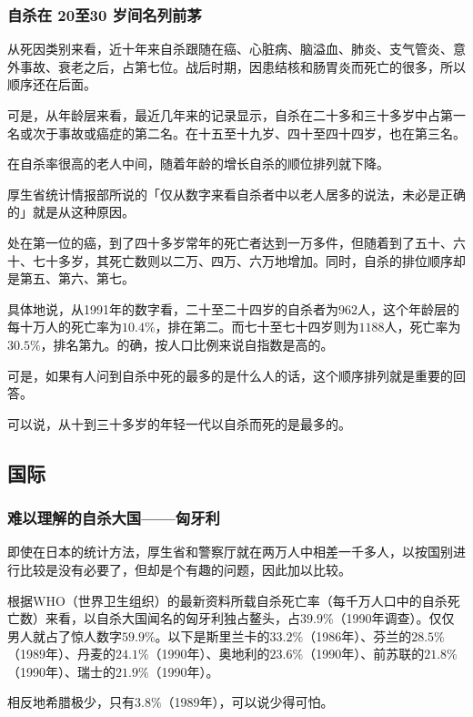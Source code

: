 \documentclass[UTF8]{ctexart}
\begin{document}
\subsubsection*{自杀在 20至30 岁间名列前茅}

从死因类别来看，近十年来自杀跟随在癌、心脏病、脑溢血、肺炎、支气管炎、意外事故、衰老之后，占第七位。战后时期，因患结核和肠胃炎而死亡的很多，所以顺序还在后面。

可是，从年龄层来看，最近几年来的记录显示，自杀在二十多和三十多岁中占第一名或次于事故或癌症的第二名。在十五至十九岁、四十至四十四岁，也在第三名。

在自杀率很高的老人中间，随着年龄的增长自杀的顺位排列就下降。

厚生省统计情报部所说的「仅从数字来看自杀者中以老人居多的说法，未必是正确的」就是从这种原因。

处在第一位的癌，到了四十多岁常年的死亡者达到一万多件，但随着到了五十、六十、七十多岁，其死亡数则以二万、四万、六万地增加。同时，自杀的排位顺序却是第五、第六、第七。

具体地说，从1991年的数字看，二十至二十四岁的自杀者为$962$人，这个年龄层的每十万人的死亡率为$10.4\%$，排在第二。而七十至七十四岁则为$1188$人，死亡率为$30.5\%$，排名第九。的确，按人口比例来说自指数是高的。

可是，如果有人问到自杀中死的最多的是什么人的话，这个顺序排列就是重要的回答。

可以说，从十到三十多岁的年轻一代以自杀而死的是最多的。

\subsection{国际}

\subsubsection*{难以理解的自杀大国——匈牙利}

即使在日本的统计方法，厚生省和警察厅就在两万人中相差一千多人，以按国别进行比较是没有必要了，但却是个有趣的问题，因此加以比较。

根据WHO（世界卫生组织）的最新资料所载自杀死亡率（每千万人口中的自杀死亡数）来看，以自杀大国闻名的匈牙利独占鳌头，占$39.9\%$（1990年调查）。仅仅男人就占了惊人数字$59.9\%$。以下是斯里兰卡的$33.2\%$（1986年）、芬兰的$28.5\%$（1989年）、丹麦的$24.1\%$（1990年）、奥地利的$23.6\%$（1990年）、前苏联的$21.8\%$（1990年）、瑞士的$21.9\%$（1990年）。

相反地希腊极少，只有$3.8\%$（1989年），可以说少得可怕。
\end{document}
